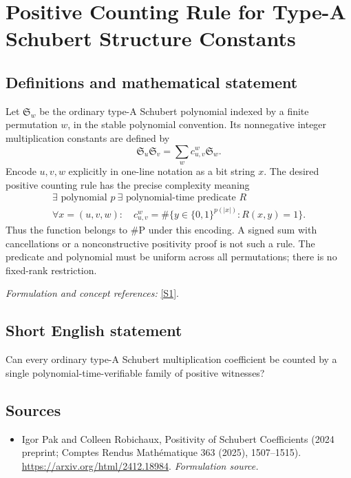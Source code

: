 \documentclass[11pt]{article}
\begin{document}
\section*{\texorpdfstring{Positive Counting Rule for Type-A Schubert Structure Constants}{Positive Counting Rule for Type-A Schubert Structure Constants}}\label{30006968}
\subsection{Definitions and mathematical statement}
Let $\mathfrak S_w$ be the ordinary type-A Schubert polynomial indexed by a finite permutation $w$, in the stable polynomial convention. Its nonnegative integer multiplication constants are defined by
\[
 \mathfrak S_u\mathfrak S_v=\sum_w c_{u,v}^{w}\mathfrak S_w.
\]
Encode $u,v,w$ explicitly in one-line notation as a bit string $x$. The desired positive counting rule has the precise complexity meaning
\[
 \begin{gathered}
 \exists\text{ polynomial }p\ \exists\text{ polynomial-time predicate }R\\
 \forall x=(u,v,w):\quad
 c_{u,v}^{w}=\#\{y\in\{0,1\}^{p(|x|)}:R(x,y)=1\}.
 \end{gathered}
\]
Thus the function belongs to $\#\mathrm P$ under this encoding. A signed sum with cancellations or a nonconstructive positivity proof is not such a rule. The predicate and polynomial must be uniform across all permutations; there is no fixed-rank restriction.
\par\smallskip\textit{Formulation and concept references:} \href{https://arxiv.org/html/2412.18984}{[S1]}.

\subsection{Short English statement}
Can every ordinary type-A Schubert multiplication coefficient be counted by a single polynomial-time-verifiable family of positive witnesses?
\subsection{Sources}
\begin{itemize}
\item[S1]Igor Pak and Colleen Robichaux, Positivity of Schubert Coefficients (2024 preprint; Comptes Rendus Mathématique 363 (2025), 1507–1515).
\url{https://arxiv.org/html/2412.18984}.
\textit{Formulation source.}
\end{itemize}
\end{document}
